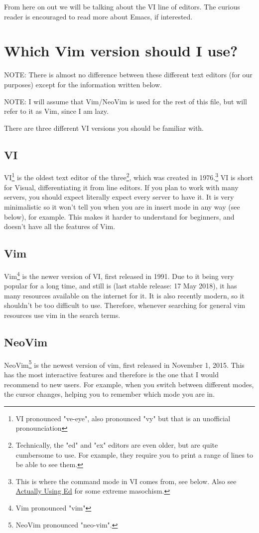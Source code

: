 \documentclass[11pt]{article}
\begin{document}
From here on out we will be talking about the VI line of editors. The curious
reader is encouraged to read more about Emacs, if interested.
\section{Which Vim version should I use?}
\label{sec:org00e4c0b}
NOTE: There is almost no difference between these different text editors (for
our purposes) except for the information written below.

NOTE: I will assume that Vim/NeoVim is used for the rest of this file, but will
refer to it as Vim, since I am lazy.

There are three different VI versions you should be familiar with.
\subsection{VI}
\label{sec:orgf45b2fc}
VI\footnote{VI pronounced "ve-eye", also pronounced "vy" but that is an unofficial pronounciation} is the oldest text editor of the three\footnote{Technically, the "ed" and "ex" editors are even older, but are quite
cumbersome to use. For example, they require you to print a range of lines to be
able to see them.}, which was created in
1976.\footnote{This is where the command mode in VI comes from, see below. Also see
\href{https://sanctum.geek.nz/arabesque/actually-using-ed/}{Actually Using Ed} for some extreme masochism.} VI is short for Visual, differentiating it from line editors. If
you plan to work with many servers, you should expect literally expect every
server to have it. It is very minimalistic so it won't tell you when you are in
insert mode in any way (see below), for example. This makes it harder to
understand for beginners, and doesn't have all the features of Vim.
\subsection{Vim}
\label{sec:orgd5c0bee}
Vim\footnote{Vim pronounced "vim"} is the newer version of VI, first released in 1991. Due to it being
very popular for a long time, and still is (last stable release: 17 May 2018),
it has many resources available on the internet for it. It is also recently
modern, so it shouldn't be too difficult to use. Therefore, whenever searching
for general vim resources use vim in the search terms.
\subsection{NeoVim}
\label{sec:org736016e}
NeoVim\footnote{NeoVim pronounced "neo-vim".} is the newest version of vim, first released in November 1, 2015.
This has the most interactive features and therefore is the one that I would
recommend to new users. For example, when you switch between different modes,
the cursor changes, helping you to remember which mode you are in.
\end{document}
